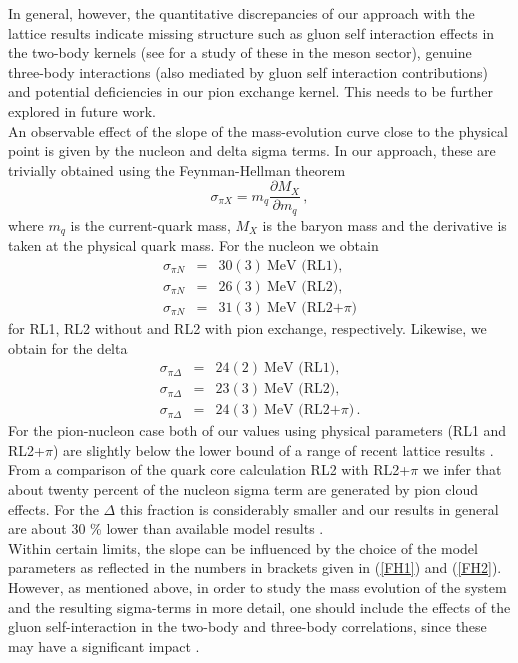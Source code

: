 In general, however, the quantitative discrepancies of our approach with the lattice 
results indicate missing structure such as gluon self interaction effects in the
two-body kernels (see \cite{Fischer:2009jm} for a study of these in the meson 
sector), genuine three-body interactions (also mediated by gluon self interaction
contributions) and potential deficiencies in our pion exchange kernel. This
needs to be further explored in future work.  \\

An observable effect of the slope of the mass-evolution curve close to the physical
point is given by the nucleon and delta sigma terms. In our approach, these are
trivially obtained using the Feynman-Hellman theorem
\begin{equation}
 \sigma_{\pi X}=m_q\frac{\partial M_X}{\partial m_q}\,,
\end{equation}\label{eq:sigma_terms}
where $m_q$ is the current-quark mass, $M_X$ is the baryon mass and the derivative 
is taken at the physical quark mass. For the nucleon we obtain 
\begin{eqnarray}
\sigma_{\pi N} &=& 30 (3)~\mbox{MeV (RL1)}, \nonumber\\
\sigma_{\pi N} &=& 26 (3)~\mbox{MeV (RL2)}, \nonumber\\
\sigma_{\pi N} &=& 31 (3)~\mbox{MeV (RL2+$\pi$)} \label{FH1}
\end{eqnarray}
for RL1, RL2 without and RL2 with pion exchange, respectively. Likewise, we obtain 
for the delta 
\begin{eqnarray}
\sigma_{\pi \Delta} &=& 24 (2)~\mbox{MeV (RL1)}, \nonumber\\
\sigma_{\pi \Delta} &=& 23 (3)~\mbox{MeV (RL2)}, \nonumber\\
\sigma_{\pi \Delta} &=& 24 (3)~\mbox{MeV (RL2+$\pi$)}\,. \label{FH2}
\end{eqnarray}
For the pion-nucleon case both of our values using physical parameters (RL1 and RL2+$\pi$) 
are slightly below the lower bound of a range of recent lattice 
results \cite{Shanahan:2012wh,Alvarez-Ruso:2013fza,Bali:2013dpa}. From a comparison of the
quark core calculation RL2 with RL2+$\pi$ we infer that about twenty percent of the nucleon
sigma term are generated by pion cloud effects. For the $\Delta$ this fraction is considerably 
smaller and our results in general are about 30 \% lower than available model 
results \cite{Lyubovitskij:2000sf,Cavalcante:2005mb}. \\

Within certain limits, the slope can be influenced by the choice of the model
parameters as reflected in the numbers in brackets given in (\ref{FH1}) and (\ref{FH2}).
However, as mentioned above, in order to study the mass evolution of the system 
and the resulting sigma-terms in more detail, one should include 
the effects of the gluon self-interaction in the two-body and three-body 
correlations, since these may have a significant impact \cite{Fischer:2009jm}. 

